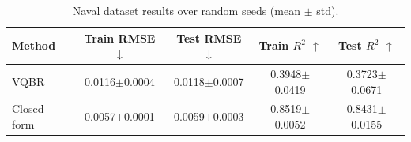 \begin{table}[t]
\centering
\caption{Naval dataset results over random seeds (mean $\pm$ std).}
\begin{tabular}{lcccc}
\toprule
Method & Train RMSE $\downarrow$ & Test RMSE $\downarrow$ & Train $R^2$ $\uparrow$ & Test $R^2$ $\uparrow$ \\
\midrule
VQBR & 0.0116$\pm$0.0004 & 0.0118$\pm$0.0007 & 0.3948$\pm$0.0419 & 0.3723$\pm$0.0671 \\
Closed-form & 0.0057$\pm$0.0001 & 0.0059$\pm$0.0003 & 0.8519$\pm$0.0052 & 0.8431$\pm$0.0155 \\
\bottomrule
\end{tabular}
\end{table}
